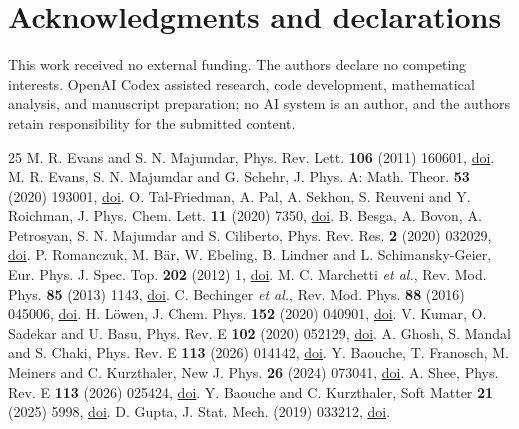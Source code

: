 \documentclass{ws-fnl}
\renewcommand{\url}[1]{\href{#1}{doi}}
\begin{document}
\section*{Acknowledgments and declarations}
This work received no external funding. The authors declare no competing interests. OpenAI Codex assisted research, code development, mathematical analysis, and manuscript preparation; no AI system is an author, and the authors retain responsibility for the submitted content.
\begin{thebibliography}{25}
 M. R. Evans and S. N. Majumdar, Phys. Rev. Lett. {\bf 106} (2011) 160601, \url{https://doi.org/10.1103/PhysRevLett.106.160601}.
 M. R. Evans, S. N. Majumdar and G. Schehr, J. Phys. A: Math. Theor. {\bf 53} (2020) 193001, \url{https://doi.org/10.1088/1751-8121/ab7cfe}.
 O. Tal-Friedman, A. Pal, A. Sekhon, S. Reuveni and Y. Roichman, J. Phys. Chem. Lett. {\bf 11} (2020) 7350, \url{https://doi.org/10.1021/acs.jpclett.0c02122}.
 B. Besga, A. Bovon, A. Petrosyan, S. N. Majumdar and S. Ciliberto, Phys. Rev. Res. {\bf 2} (2020) 032029, \url{https://doi.org/10.1103/PhysRevResearch.2.032029}.
 P. Romanczuk, M. B\"ar, W. Ebeling, B. Lindner and L. Schimansky-Geier, Eur. Phys. J. Spec. Top. {\bf 202} (2012) 1, \url{https://doi.org/10.1140/epjst/e2012-01529-y}.
 M. C. Marchetti \textit{et al.}, Rev. Mod. Phys. {\bf 85} (2013) 1143, \url{https://doi.org/10.1103/RevModPhys.85.1143}.
 C. Bechinger \textit{et al.}, Rev. Mod. Phys. {\bf 88} (2016) 045006, \url{https://doi.org/10.1103/RevModPhys.88.045006}.
 H. L\"owen, J. Chem. Phys. {\bf 152} (2020) 040901, \url{https://doi.org/10.1063/1.5134455}.
 V. Kumar, O. Sadekar and U. Basu, Phys. Rev. E {\bf 102} (2020) 052129, \url{https://doi.org/10.1103/PhysRevE.102.052129}.
 A. Ghosh, S. Mandal and S. Chaki, Phys. Rev. E {\bf 113} (2026) 014142, \url{https://doi.org/10.1103/11f6-srsx}.
 Y. Baouche, T. Franosch, M. Meiners and C. Kurzthaler, New J. Phys. {\bf 26} (2024) 073041, \url{https://doi.org/10.1088/1367-2630/ad602a}.
 A. Shee, Phys. Rev. E {\bf 113} (2026) 025424, \url{https://doi.org/10.1103/xvkg-qcjq}.
 Y. Baouche and C. Kurzthaler, Soft Matter {\bf 21} (2025) 5998, \url{https://doi.org/10.1039/D5SM00340G}.
 D. Gupta, J. Stat. Mech. (2019) 033212, \url{https://doi.org/10.1088/1742-5468/ab054a}.

\end{thebibliography}
\end{document}
